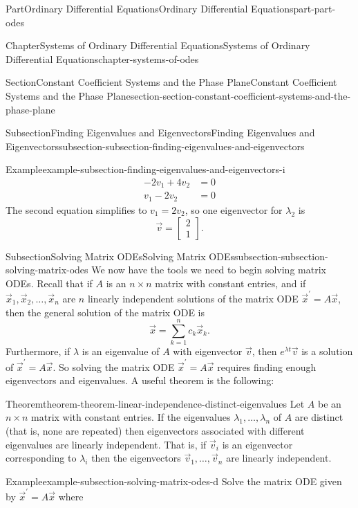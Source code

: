\documentclass[twoside,10pt,]{book}
\numberwithin{equation}{part}
\begin{document}
\begin{partptx}{Part}{Ordinary Differential Equations}{}{Ordinary Differential Equations}{}{}{part-part-odes}
\begin{chapterptx}{Chapter}{Systems of Ordinary Differential Equations}{}{Systems of Ordinary Differential Equations}{}{}{chapter-systems-of-odes}
\begin{sectionptx}{Section}{Constant Coefficient Systems and the Phase Plane}{}{Constant Coefficient Systems and the Phase Plane}{}{}{section-section-constant-coefficient-systems-and-the-phase-plane}
\begin{subsectionptx}{Subsection}{Finding Eigenvalues and Eigenvectors}{}{Finding Eigenvalues and Eigenvectors}{}{}{subsection-subsection-finding-eigenvalues-and-eigenvectors}
\begin{example}{Example}{}{example-subsection-finding-eigenvalues-and-eigenvectors-i}
\begin{align*}
-2v_{1}+4v_{2} & = 0\\
v_{1} - 2v_{2} & = 0
\end{align*}
The second equation simplifies to \(v_{1} = 2v_{2}\), so one eigenvector for \(\lambda_{2}\) is%
\begin{equation*}
\vec{v} = \begin{bmatrix}2 \\ 1\end{bmatrix}.
\end{equation*}
%
\end{example}
\end{subsectionptx}
%
%
\typeout{************************************************}
\typeout{************************************************}
%
\begin{subsectionptx}{Subsection}{Solving Matrix ODEs}{}{Solving Matrix ODEs}{}{}{subsection-subsection-solving-matrix-odes}
We now have the tools we need to begin solving matrix ODEs. Recall that if \(A\) is an \(n\times n\) matrix with constant entries, and if \(\vec{x}_{1},\vec{x}_{2},\ldots,\vec{x}_{n}\) are \(n\) linearly independent solutions of the matrix ODE \(\vec{x}^\prime=A\vec{x}\), then the general solution of the matrix ODE is%
\begin{equation*}
\vec{x} = \sum_{k=1}^{n}c_{k}\vec{x}_{k}.
\end{equation*}
Furthermore, if \(\lambda\) is an eigenvalue of \(A\) with eigenvector \(\vec{v}\), then \(e^{\lambda t}\vec{v}\) is a solution of \(\vec{x}^\prime=A\vec{x}\). So solving the matrix ODE \(\vec{x}^\prime=A\vec{x}\) requires finding enough eigenvectors and eigenvalues. A useful theorem is the following:%
\begin{theorem}{Theorem}{}{}{theorem-theorem-linear-independence-distinct-eigenvalues}%
Let \(A\) be an \(n\times n\) matrix with constant entries. If the eigenvalues \(\lambda_{1},\ldots,\lambda_{n}\) of \(A\) are distinct (that is, none are repeated) then eigenvectors associated with different eigenvalues are linearly independent. That is, if \(\vec{v}_{i}\) is an eigenvector corresponding to \(\lambda_{i}\) then the eigenvectors \(\vec{v}_{1},\ldots,\vec{v}_{n}\) are linearly independent.%
\end{theorem}
\begin{example}{Example}{}{example-subsection-solving-matrix-odes-d}%
Solve the matrix ODE given by \(\vec{x}^\prime = A\vec{x}\) where%

\end{example}
\end{subsectionptx}
\end{sectionptx}
\end{chapterptx}
\end{partptx}
\end{document}
